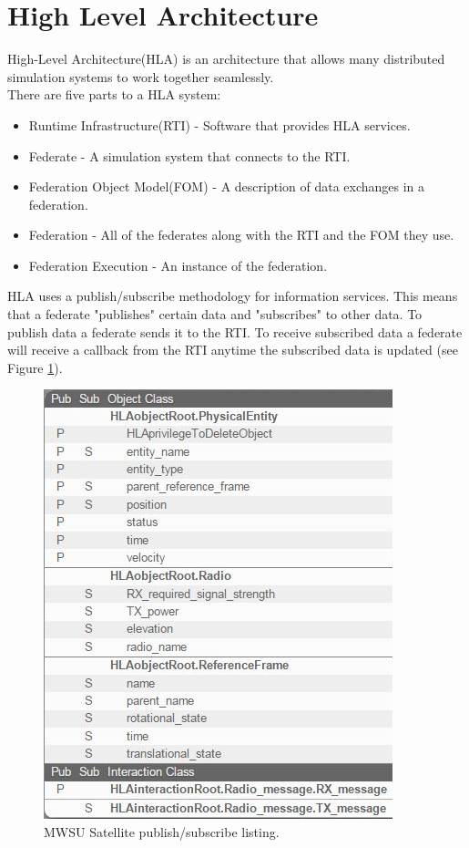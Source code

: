 \documentclass[conference]{IEEEtran}
\begin{document}
\section{High Level Architecture}
High-Level Architecture(HLA) is an architecture that allows many distributed simulation systems to work together seamlessly. \\
		There are five parts to a HLA system:
		\begin{itemize}
			\item Runtime Infrastructure(RTI) - Software that provides HLA services.
			\item Federate - A simulation system that connects to the RTI.
			\item Federation Object Model(FOM) - A description of data exchanges in a federation.
			\item Federation - All of the federates along with the RTI and the FOM they use.
			\item Federation Execution - An instance of the federation.
		\end{itemize}
		HLA uses a publish/subscribe methodology for information services. This means that a federate "publishes" certain data and "subscribes" to other data. To publish data a federate sends it to the RTI. To receive subscribed data a federate will receive a callback from the RTI anytime the subscribed data is updated (see Figure \ref{interactions}). \\
\begin{figure}[!htbp]
	\centering
		\includegraphics[width=\linewidth]{interactions.png}
		\caption{MWSU Satellite publish/subscribe listing.}
	\label{interactions}
\end{figure}
		
\end{document}
